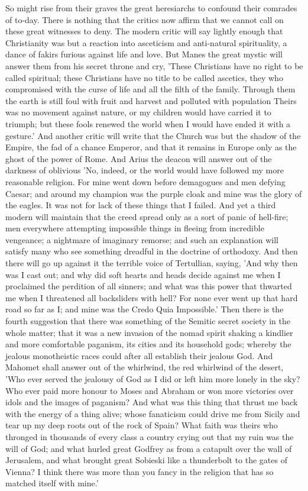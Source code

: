 So might rise from their graves the great heresiarchs to confound their comrades of to-day. There is nothing that the critics now affirm that we cannot call on these great witnesses to deny. The modern critic will say lightly enough that Christianity was but a reaction into asceticism and anti-natural spirituality, a dance of fakirs furious against life and love. But Manes the great mystic will answer them from his secret throne and cry, 'These Christians have no right to be called spiritual; these Christians have no title to be called ascetics, they who compromised with the curse of life and all the filth of the family. Through them the earth is still foul with fruit and harvest and polluted with population Theirs was no movement against nature, or my children would have carried it to triumph; but these fools renewed the world when I would have ended it with a gesture.' And another critic will write that the Church was but the shadow of the Empire, the fad of a chance Emperor, and that it remains in Europe only as the ghost of the power of Rome. And Arius the deacon will answer out of the darkness of oblivious 'No, indeed, or the world would have followed my more reasonable religion. For mine went down before demagogues and men defying Caesar; and around my champion was the purple cloak and mine was the glory of the eagles. It was not for lack of these things that I failed. And yet a third modern will maintain that the creed spread only as a sort of panic of hell-fire; men everywhere attempting impossible things in fleeing from incredible vengeance; a nightmare of imaginary remorse; and such an explanation will satisfy many who see something dreadful in the doctrine of orthodoxy. And then there will go up against it the terrible voice of Tertullian, saying, 'And why then was I cast out; and why did soft hearts and heads decide against me when I proclaimed the perdition of all sinners; and what was this power that thwarted me when I threatened all backsliders with hell? For none ever went up that hard road so far as I; and mine was the Credo Quia Impossible.' Then there is the fourth suggestion that there was something of the Semitic secret society in the whole matter; that it was a new invasion of the nomad spirit shaking a kindlier and more comfortable paganism, its cities and its household gods; whereby the jealous monotheistic races could after all establish their jealous God. And Mahomet shall answer out of the whirlwind, the red whirlwind of the desert, 'Who ever served the jealousy of God as I did or left him more lonely in the sky? Who ever paid more honour to Moses and Abraham or won more victories over idols and the images of paganism? And what was this thing that thrust me back with the energy of a thing alive; whose fanaticism could drive me from Sicily and tear up my deep roots out of the rock of Spain? What faith was theirs who thronged in thousands of every class a country crying out that my ruin was the will of God; and what hurled great Godfrey as from a catapult over the wall of Jerusalem, and what brought great Sobieski like a thunderbolt to the gates of Vienna? I think there was more than you fancy in the religion that has so matched itself with mine.'

